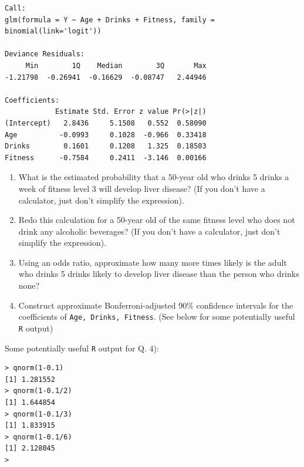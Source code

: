 \documentclass{article}
\begin{document}
\begin{enumerate}
\begin{verbatim}
Call:
glm(formula = Y ~ Age + Drinks + Fitness, family = binomial(link='logit'))

Deviance Residuals:
     Min        1Q    Median        3Q       Max
-1.21798  -0.26941  -0.16629  -0.08747   2.44946

Coefficients:
            Estimate Std. Error z value Pr(>|z|)
(Intercept)   2.8436     5.1508   0.552  0.58090
Age          -0.0993     0.1028  -0.966  0.33418
Drinks        0.1601     0.1208   1.325  0.18503
Fitness      -0.7584     0.2411  -3.146  0.00166 

\end{verbatim}

\begin{enumerate}

\item What is the estimated probability that a 50-year old who drinks
5 drinks a week of fitness level 3 will develop
liver disease? ({\sc If you don't have a calculator, just don't simplify the expression}).

\qspace 

\item Redo this calculation for a 50-year old of the same fitness level who does not drink any alcoholic beverages? ({\sc If you don't have a calculator, just don't simplify the expression}).

\qspace 


\item Using an odds ratio, approximate how many more times likely is the
adult who drinks 5 drinks likely to develop liver disease than the person who drinks none? 

\qspace 


\item Construct approximate Bonferroni-adjusted 90\% confidence intervals
for the coefficients of {\tt Age, Drinks, Fitness}. ({\sc See below for some potentially
useful {\tt R} output})

\qspace 

\end{enumerate}

\newpage

Some potentially useful {\tt R} output for Q. 4):

\begin{verbatim}
> qnorm(1-0.1)
[1] 1.281552
> qnorm(1-0.1/2)
[1] 1.644854
> qnorm(1-0.1/3)
[1] 1.833915
> qnorm(1-0.1/6)
[1] 2.128045
>                  
\end{verbatim}

\end{enumerate}
\end{document}
